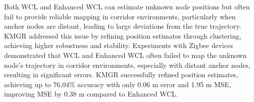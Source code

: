 \documentclass[journal]{IEEEtran}
\begin{document}
Both WCL and Enhanced WCL can estimate unknown node positions but often fail to provide reliable mapping in corridor environments, particularly when anchor nodes are distant, leading to large deviations from the true trajectory. KMGR addressed this issue by refining position estimates through clustering, achieving higher robustness and stability. Experiments with Zigbee devices demonstrated that WCL and Enhanced WCL often failed to map the unknown node’s trajectory in corridor environments, especially with distant anchor nodes, resulting in significant errors. KMGR successfully refined position estimates, achieving up to 76.04\% accuracy with only 0.06 m error and 1.95 m MSE, improving MSE by 0.38 m compared to Enhanced WCL.






\ifCLASSOPTIONcaptionsoff
  \newpage
\fi






\vfill
\end{document}
